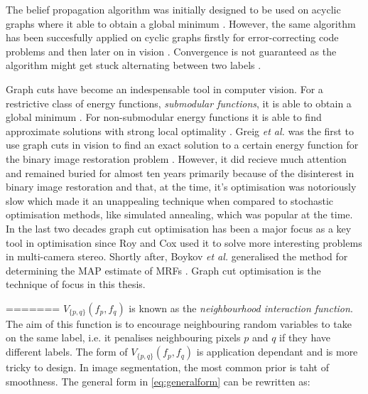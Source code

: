 \begin{definition}
	The belief propagation algorithm was initially designed to be used on acyclic graphs  where it able to obtain a global minimum \citep{Pearl1988}.
	However, the same algorithm has been succesfully applied on cyclic graphs firstly for error-correcting code problems \citep{Frey1998} and then later on in vision \citep{Freeman2000}.
	Convergence is not guaranteed as the algorithm might get stuck alternating between two labels \citep{Pearl1988}.
\end{definition}
  
\begin{definition}
	Graph cuts have become an indespensable tool in computer vision.
	For a restrictive class of energy functions, \textit{submodular functions}, it is able to obtain a global minimum \citep{Kolmogorov2004,Boykov2001_2,Boykvo2001_3,Kolmogorov2007}.
	For non-submodular energy functions it is able to find approximate solutions with strong local optimality \citep{Boykov2001,Kohli2009,Komodakis2007,Kumar2009}.
	Greig \textit{et al.} was the first to use graph cuts in vision to find an exact solution to a certain energy function for the binary image restoration problem \citep{Greig1989}.
	However, it did recieve much attention and remained buried for almost ten years primarily because of the disinterest in binary image restoration and that, at the time, it's optimisation was notoriously slow which made it an unappealing technique when compared to stochastic optimisation methods, like simulated annealing, which was popular at the time.
	In the last two decades graph cut optimisation has been a major focus as a key tool in optimisation since Roy and Cox \citep{Roy1998} used it to solve more interesting problems in multi-camera stereo.
	Shortly after, Boykov \textit{et al.} generalised the method for determining the MAP estimate of MRFs \citep{Boykov1998}.
	Graph cut optimisation is the technique of focus in this thesis.
\end{definition}
  
=======
$V_{\{p,q\}}(f_p,f_q)$ is known as the \textit{neighbourhood interaction function}. The aim of this function is to encourage neighbouring random variables to take on the same label, i.e. it penalises neighbouring pixels $p$ and $q$ if they have different labels. The form of $V_{\{p,q\}}(f_p,f_q)$ is application dependant and is more tricky to design. In image segmentation, the most common prior is taht of smoothness. The general form in \autoref{eq:generalform} can be rewritten as:

